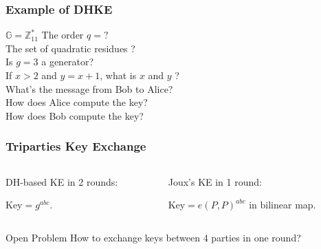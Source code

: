 \begin{frame}\frametitle{Example of DHKE}
\begin{exampleblock}{$\mathbb{G} = \mathbb{Z}^*_{11}$}
The order $q = ?$\\ %
The set of quadratic residues ?\\ %
Is $g = 3$ a generator? \\ %
If $x > 2$ and $y = x + 1$, what is $x$ and $y$ ?\\ %
What's the message from Bob to Alice?\\ %
How does Alice compute the key?\\ %
How does Bob compute the key? %
\end{exampleblock}
\end{frame}
\begin{frame}\frametitle{Triparties Key Exchange}
\begin{columns}[]
\begin{column}{5cm}
\begin{center}
DH-based KE in 2 rounds:
\begin{figure}

\end{figure}
Key$=g^{abc}$.
\end{center}
\end{column}
\begin{column}{6cm}
\begin{center}
Joux's KE in 1 round:
\begin{figure}

\end{figure}
Key$=e(P,P)^{abc}$ in bilinear map.
\end{center}
\end{column}
\end{columns}
\begin{block}{Open Problem}
How to exchange keys between 4 parties in one round?
\end{block}
\end{frame}
